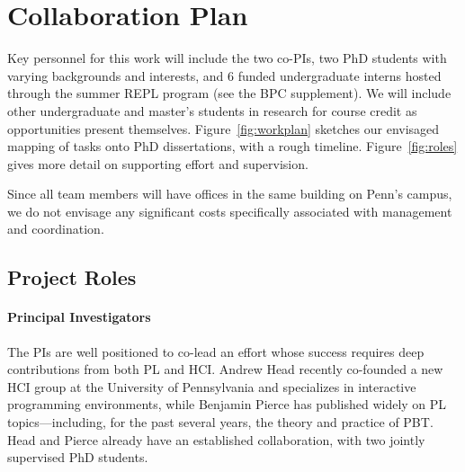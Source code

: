 \section*{Collaboration Plan }\label{appendix:coord}


Key personnel for this work will include the two co-PIs, two PhD
students with varying backgrounds and interests,
and 6 funded undergraduate interns hosted through the summer REPL
program (see the BPC supplement). We will include other undergraduate and
master's students in research for course credit as opportunities
present themselves.
Figure~\ref{fig:workplan} sketches our envisaged mapping of tasks onto
PhD dissertations, with a rough timeline.  Figure~\ref{fig:roles}
gives more detail on supporting effort and supervision.

Since all team members will have offices in the same building on
Penn's campus, we do not envisage any significant costs specifically
associated with management and coordination.

\subsection*{Project Roles}

\paragraph*{Principal Investigators}
%
The PIs are well positioned to co-lead an effort whose success
requires deep contributions from both PL and HCI.  Andrew Head
recently co-founded a new HCI group at the University of Pennsylvania
and specializes in interactive programming environments, while
Benjamin Pierce has published widely on PL topics---including, for the
past several years, the theory and practice of PBT.  Head and Pierce
already have an established collaboration, with two jointly supervised
PhD students.


